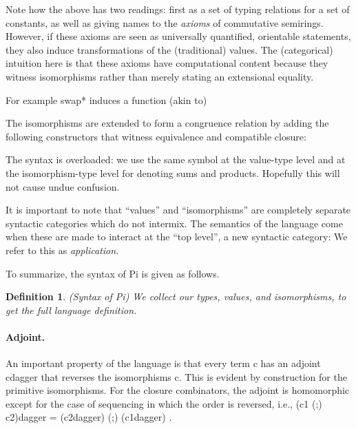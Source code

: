 \documentclass[preprint]{sigplanconf}
\newtheorem{definition}[theorem]{Definition}
\begin{document}
Note how the above has two readings: first as a set of typing relations for
a set of constants, as well as giving names to the \emph{axioms} of
commutative semirings.  However, if these axioms are seen as universally
quantified, orientable statements, they also induce transformations of
the (traditional) values.  The (categorical) intuition here is that 
these axioms have computational content because they witness isomorphisms
rather than merely stating an extensional equality.

For example {{ swap* }} induces a function (akin to)

The isomorphisms are extended to form a congruence relation by adding the
following constructors that witness equivalence and compatible closure:
%
%
%

The syntax is overloaded: we use the same symbol at the value-type level
and at the isomorphism-type level for denoting sums and products.  Hopefully
this will not cause undue confusion.

It is important to note that ``values'' and ``isomorphisms'' are 
completely separate syntactic categories which do not intermix.  The 
semantics of the language come when these are made to interact at
the ``top level'', a new syntactic category:
We refer to this as \emph{application}.

\noindent
To summarize, the syntax of {{Pi}} is given as follows. 

\begin{definition}{(Syntax of {{Pi}})}
\label{def:Pi}
We collect our types, values, and isomorphisms, to get the full language
definition.
%
\end{definition}

\paragraph*{Adjoint.} 
An important property of the language is that every term {{c}} has an
adjoint {{c{dagger}}} that reverses the isomorphisms {{c}}.  This is evident by
construction for the primitive isomorphisms. For the closure combinators, the
adjoint is homomorphic except for the case of sequencing in which the order
is reversed, i.e., {{(c1 (;) c2){dagger} = (c2{dagger}) (;) (c1{dagger}) }}.
\end{document}
